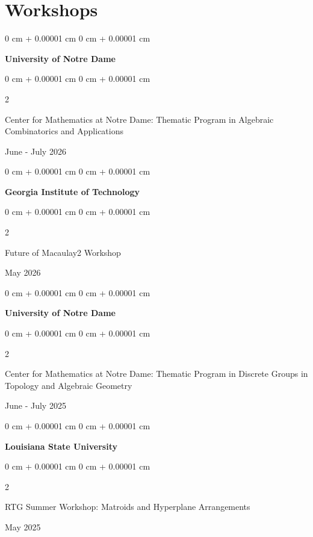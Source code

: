\documentclass[10pt, letterpaper]{article}
\newenvironment{onecolentry}{
    \begin{adjustwidth}{
        0 cm + 0.00001 cm
    }{
        0 cm + 0.00001 cm
    }
}{
    \end{adjustwidth}
} %
\newenvironment{twocolentry}[2][]{
    \onecolentry
    \def\secondColumn{#2}
    \setcolumnwidth{\fill, 4.5 cm}
    \begin{paracol}{2}
}{
    \switchcolumn \raggedleft \secondColumn
    \end{paracol}
    \endonecolentry
} %
\begin{document}
        \section{Workshops}
        \begin{onecolentry}
            \textbf{University of Notre Dame}
        \end{onecolentry}
        \vspace{0.05cm}
        \begin{twocolentry}{
            June - July 2026
        }
            Center for Mathematics at Notre Dame: Thematic Program in Algebraic Combinatorics and Applications
        \end{twocolentry}
        \vspace{0.2cm}
        \begin{onecolentry}
            \textbf{Georgia Institute of Technology}
        \end{onecolentry}
        \vspace{0.05cm}
        \begin{twocolentry}{
            May 2026
        }
            Future of Macaulay2 Workshop
        \end{twocolentry}
        \vspace{0.2cm}
        \begin{onecolentry}
            \textbf{University of Notre Dame}
        \end{onecolentry}
        \vspace{0.05cm}
        \begin{twocolentry}{
            June - July 2025
        }
            Center for Mathematics at Notre Dame: Thematic Program in Discrete Groups in Topology and Algebraic Geometry
        \end{twocolentry}
        \vspace{0.2cm}
        \begin{onecolentry}
            \textbf{Louisiana State University}
        \end{onecolentry}
        \vspace{0.05cm}
        \begin{twocolentry}{
            May 2025
        }
            RTG Summer Workshop: Matroids and Hyperplane Arrangements
        \end{twocolentry}
\end{document}
